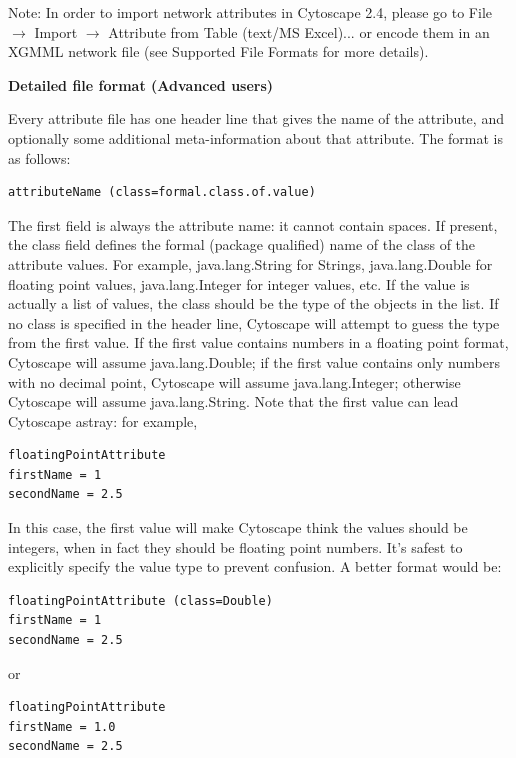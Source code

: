  Note: In order to import network attributes in Cytoscape 2.4, please go to
File $\rightarrow$ Import $\rightarrow$ Attribute from Table (text/MS Excel)...
or encode them in an XGMML network file (see Supported File Formats for more
details). 

 \textbf{Detailed file format (Advanced users)}

 Every attribute file has one header line that gives the name of the attribute,
and optionally some additional meta-information about that attribute. The
format is as follows: 

 \begin{verbatim}
attributeName (class=formal.class.of.value)
\end{verbatim}

 The first field is always the attribute name: it cannot contain spaces. If
present, the class field defines the formal (package qualified) name of the
class of the attribute values. For example, java.lang.String for Strings,
java.lang.Double for floating point values, java.lang.Integer for integer
values, etc. If the value is actually a list of values, the class should be the
type of the objects in the list. If no class is specified in the header line,
Cytoscape will attempt to guess the type from the first value. If the first
value contains numbers in a floating point format, Cytoscape will assume
java.lang.Double; if the first value contains only numbers with no decimal
point, Cytoscape will assume java.lang.Integer; otherwise Cytoscape will assume
java.lang.String. Note that the first value can lead Cytoscape astray: for
example, 

 \begin{verbatim}
floatingPointAttribute
firstName = 1
secondName = 2.5
\end{verbatim}

 In this case, the first value will make Cytoscape think the values should be
integers, when in fact they should be floating point numbers. It's safest to
explicitly specify the value type to prevent confusion. A better format would
be: 


 \begin{verbatim}
floatingPointAttribute (class=Double)
firstName = 1
secondName = 2.5
\end{verbatim}

 or 

 \begin{verbatim}
floatingPointAttribute 
firstName = 1.0
secondName = 2.5
\end{verbatim}

